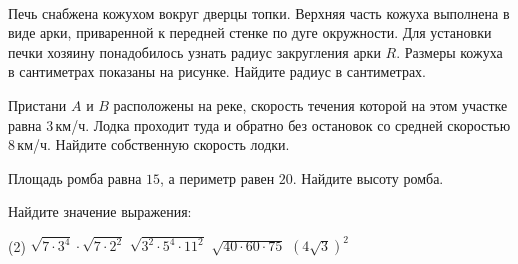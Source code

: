\begin{homework}[number=1]
\begin{listofex}
\begin{minipage}[c]{0.2\textwidth}
		\end{minipage}\\
		Печь снабжена кожухом вокруг дверцы топки. Верхняя часть кожуха выполнена в виде арки, приваренной к передней стенке по дуге окружности. Для установки печки хозяину понадобилось узнать радиус закругления арки \( R \). Размеры кожуха в сантиметрах показаны на рисунке. Найдите радиус в сантиметрах.
		\item Пристани \( A \) и \( B \) расположены на реке, скорость течения которой на этом участке равна \( 3 \) км/ч. Лодка проходит туда и обратно без остановок со средней скоростью \( 8 \) км/ч. Найдите собственную скорость лодки.
		\item Площадь ромба равна \( 15 \), а периметр равен \( 20 \). Найдите высоту ромба.
		\item Найдите значение выражения:
		\begin{tasks}(2)
			\task \( \sqrt{7\cdot3^4}\cdot\sqrt{7\cdot2^2} \)
			\task \( \sqrt{3^2\cdot5^4\cdot11^2} \)
			\task \( \sqrt{40\cdot60\cdot75} \)
			\task \( (4\sqrt{3})^2 \)
		\end{tasks}
	\end{listofex}
	\end{homework}

